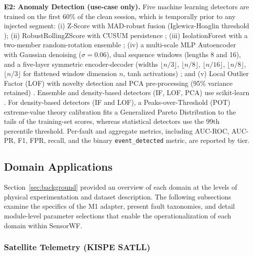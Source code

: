 \documentclass[conference]{IEEEtran}
\begin{document}
\textbf{E2: Anomaly Detection (use-case only).} Five machine learning detectors are trained on the first 60\% of the clean session, which is temporally prior to any injected segment: (i) Z-Score with MAD-robust fusion (Iglewicz-Hoaglin threshold \cite{iglewicz1993outliers}); (ii) RobustRollingZScore with CUSUM persistence \cite{page1954cusum}; (iii) IsolationForest with a two-member random-rotation ensemble \cite{liu2008isolation}; (iv) a multi-scale MLP Autoencoder with Gaussian denoising ($\sigma\!=\!0.06$), dual sequence windows (lengths 8 and 16), and a five-layer symmetric encoder-decoder (widths $\lfloor n/3\rfloor$, $\lfloor n/8\rfloor$, $\lfloor n/16\rfloor$, $\lfloor n/8\rfloor$, $\lfloor n/3\rfloor$ for flattened window dimension $n$, tanh activations) \cite{sakurada2014autoencoder}; and (v) Local Outlier Factor (LOF) with novelty detection and PCA pre-processing (95\% variance retained) \cite{breunig2000lof}. Ensemble and density-based detectors (IF, LOF, PCA) use scikit-learn \cite{pedregosa2011sklearn}. For density-based detectors (IF and LOF), a Peaks-over-Threshold (POT) extreme-value theory calibration \cite{siffer2017evt} fits a Generalized Pareto Distribution to the tails of the training-set scores, whereas statistical detectors use the 99th percentile threshold. Per-fault and aggregate metrics, including AUC-ROC, AUC-PR, F1, FPR, recall, and the binary \texttt{event\_detected} metric, are reported by tier.

\subsection{Domain Applications}

Section~\ref{sec:background} provided an overview of each domain at the levels of physical experimentation and dataset description. The following subsections examine the specifics of the M1 adapter, present fault taxonomies, and detail module-level parameter selections that enable the operationalization of each domain within SensorWF.


\subsubsection{Satellite Telemetry (KISPE SATLL)}
\end{document}
